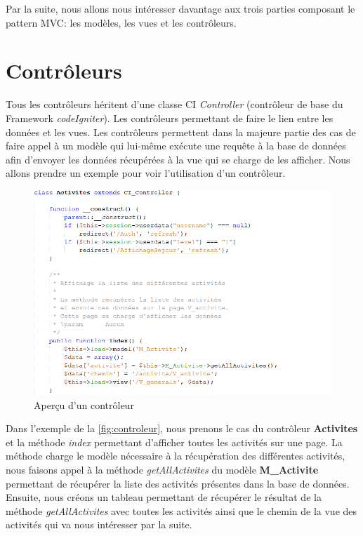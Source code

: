 \documentclass{polytech/polytech}
\begin{document}
Par la suite, nous allons nous intéresser davantage aux trois parties composant le pattern MVC: les modèles, les vues et les contrôleurs.

\section{Contrôleurs}

Tous les contrôleurs héritent d'une classe CI \textit{Controller} (contrôleur de base du Framework \textit{codeIgniter}). Les contrôleurs permettant de faire le lien entre les données et les vues. Les contrôleurs permettent dans la majeure partie des cas de faire appel à un modèle qui lui-même exécute une requête à la base de données afin d'envoyer les données récupérées à la vue qui se charge de les afficher. 
Nous allons prendre un exemple pour voir l'utilisation d'un contrôleur. 

\begin{figure}
	\includegraphics[scale=0.8]{images/controleur}
	\caption{Aperçu d'un contrôleur}
	\label{fig:controleur}
\end{figure}

Dans l'exemple de la \autoref{fig:controleur}, nous prenons le cas du contrôleur \textbf{Activites} et la méthode \textit{index} permettant d'afficher toutes les activités sur une page. La méthode charge le modèle nécessaire à la récupération des différentes activités, nous faisons appel à la méthode \textit{getAllActivites} du modèle \textbf{M\_Activite} permettant de récupérer la liste des activités présentes dans la base de données. Ensuite, nous créons un tableau permettant de récupérer le résultat de la méthode \textit{getAllActivites} avec toutes les activités ainsi que le chemin de la vue des activités qui va nous intéresser par la suite.
\end{document}
